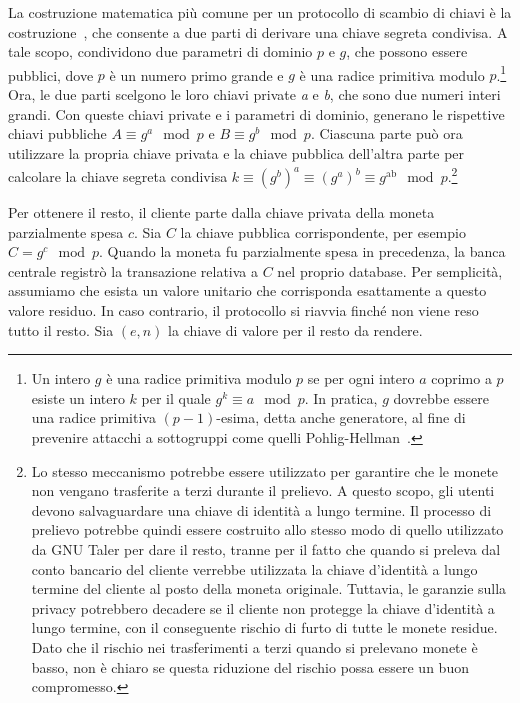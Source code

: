 \documentclass[a4paper]{article}
\begin{document}
La costruzione matematica più comune per un protocollo di scambio di
chiavi è la costruzione~\cite{Diffie}, che
consente a due parti di derivare una chiave segreta condivisa. A tale
scopo, condividono due parametri di dominio $p$ e $g$, che possono
essere pubblici, dove $p$ è un numero primo grande e $g$ è una radice
primitiva modulo $p$.\footnote{Un intero $g$ è una radice primitiva
modulo $p$ se per ogni intero $a$ coprimo a $p$ esiste un intero $k$
per il quale
$g^k \equiv a \mod p$.
In pratica, $g$ dovrebbe essere una radice primitiva $(p-1)$-esima, detta
anche generatore, al fine di prevenire attacchi a sottogruppi come quelli
Pohlig-Hellman~\cite[vedi][]{Lim}.} Ora, le due parti scelgono le loro
chiavi private \emph{a} e \emph{b}, che sono due numeri interi grandi.
Con queste chiavi private e i parametri di dominio, generano le
rispettive chiavi pubbliche
$A \equiv g^{a} \mod p$ e $B \equiv g^{b} \mod p$.
Ciascuna parte può ora utilizzare la propria chiave privata e la chiave
pubblica dell'altra parte per calcolare la chiave segreta condivisa
$k \equiv \left( g^b \right)^{a} \equiv \left( g^{a} \right)^{b} \equiv g^{\text{ab}} \mod p$.\footnote{
Lo stesso meccanismo potrebbe essere utilizzato per garantire
che le monete non vengano trasferite a terzi durante il prelievo. A
questo scopo, gli utenti devono salvaguardare una chiave di identità a
lungo termine. Il processo di prelievo potrebbe quindi essere
costruito allo stesso modo di quello utilizzato da GNU Taler per dare
il resto, tranne per il fatto che quando si preleva dal conto bancario
del cliente verrebbe utilizzata la chiave d'identità a lungo termine
del cliente al posto della moneta originale. Tuttavia, le garanzie
sulla privacy potrebbero decadere se il cliente non protegge la chiave
d'identità a lungo termine, con il conseguente rischio di furto di
tutte le monete residue. Dato che il rischio nei trasferimenti a terzi
quando si prelevano monete è basso, non è chiaro se questa riduzione
del rischio possa essere un buon compromesso.}

Per ottenere il resto, il cliente parte dalla chiave privata della
moneta parzialmente spesa $c$. Sia $C$ la chiave pubblica corrispondente,
per esempio
$C = g^{c} \mod p$.
Quando la moneta fu parzialmente spesa in precedenza, la banca centrale
registrò la transazione relativa a $C$ nel proprio database. Per
semplicità, assumiamo che esista un valore unitario che corrisponda
esattamente a questo valore residuo. In caso contrario, il protocollo si
riavvia finché non viene reso tutto il resto. Sia $(e,n)$ la
chiave di valore per il resto da rendere.
\end{document}
